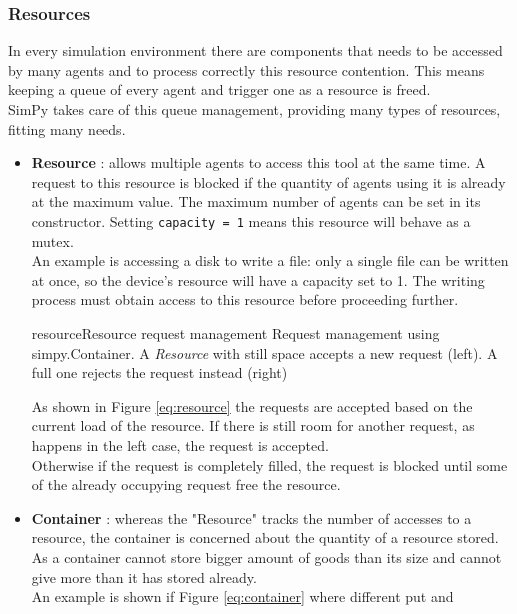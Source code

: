\subsubsection*{Resources}
In every simulation environment there are components that needs to be accessed
by many agents and to process correctly this resource contention. This means
keeping a queue of every agent and trigger one as a resource is freed. \\
SimPy takes care of this queue management, providing many types of resources,
fitting many needs.
\begin{itemize}
    \item \textbf{Resource} \cite{simpy-resource}: 
        allows multiple agents to access this tool at the same time. A
        request to this resource is blocked if the quantity of agents using it
        is already at the maximum value. The maximum number of agents
        can be set in its constructor. Setting \texttt{capacity = 1} means this
        resource will behave as a mutex. \\
        An example is accessing a disk to write a file: only a single file can be
        written at once, so the device's resource will have a capacity set to 1.
        The writing process must obtain access to this resource before
        proceeding further. \\
        \begin{myimage}{resource}{Resource request management}
            Request management using simpy.Container. A \textit{Resource} with
            still space accepts a new request (left). A full one rejects the
            request instead (right)
        \end{myimage}
        As shown in Figure \ref{eq:resource} the requests are accepted based on
        the current load of the resource. If there is still room for another
        request, as happens in the left case, the request is accepted. \\
        Otherwise if the request is completely filled, the request is blocked
        until some of the already occupying request free the resource.
    \item \textbf{Container} \cite{simpy-container}: whereas the "Resource"
        tracks the number of accesses to a resource, the container is concerned
        about the quantity of a resource stored. As a container cannot store
        bigger amount of goods than its size and cannot give more than it has
        stored already.  \\
        An example is shown if Figure \ref{eq:container} where different put and

\end{itemize}

